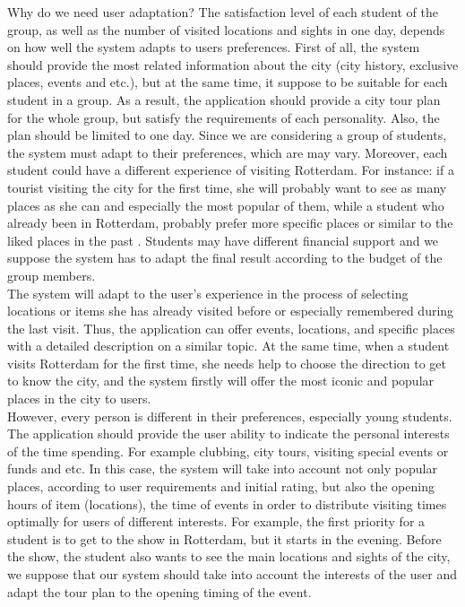\documentclass[12pt,a4paper,oneside]{article}
\begin{document}
Why do we need user adaptation? The satisfaction level of each student of the group, as well as the number of visited locations and sights in one day, depends on how well the system adapts to users preferences. First of all, the system should provide the most related information about the city (city history, exclusive places, events and etc.), but at the same time, it suppose to be suitable for each student in a group. As a result, the application should provide a city tour plan for the whole group, but satisfy the requirements of each personality. Also, the plan should be limited to one day. Since we are considering a group of students, the system must adapt to their preferences, which are may vary. Moreover, each student could have a different experience of visiting Rotterdam. For instance: if a tourist visiting the city for the first time, she will probably want to see as many places as she can and especially the most popular of them, while a student who already been in Rotterdam, probably prefer more specific places or similar to the liked places in the past \cite{predicting}. Students may have different financial support and we suppose the system has to adapt the final result according to the budget of the group members.\\

The system will adapt to the user's experience in the process of selecting locations or items she has already visited before or especially remembered during the last visit. Thus, the application can offer events, locations, and specific places with a detailed description on a similar topic. At the same time, when a student visits Rotterdam for the first time, she needs help to choose the direction to get to know the city, and the system firstly will offer the most iconic and popular places in the city to users.\\

However, every person is different in their preferences, especially young students. The application should provide the user ability to indicate the personal interests of the time spending. For example clubbing, city tours, visiting special events or funds and etc. In this case, the system will take into account not only popular places, according to user requirements and initial rating, but also the opening hours of item (locations), the time of events in order to distribute visiting times optimally for users of different interests. For example, the first priority for a student is to get to the show in Rotterdam, but it starts in the evening. Before the show, the student also wants to see the main locations and sights of the city, we suppose that our system should take into account the interests of the user and adapt the tour plan to the opening timing of the event. \\
\end{document}
